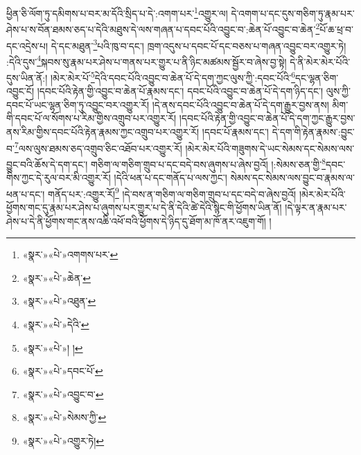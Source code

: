 ཕྱིན་ཅི་ལོག་ཏུ་དམིགས་པ་བར་མ་དོའི་སྲིད་པ་དེ་:འགག་པར་\footnote{«སྣར་»«པེ་»འགགས་པར་}འགྱུར་ལ། དེ་འགག་པ་དང་དུས་གཅིག་ཏུ་རྣམ་པར་ཤེས་པ་ས་བོན་ཐམས་ཅད་པ་དེའི་མཐུས་དེ་ལས་གཞན་པ་དབང་པོའི་འབྱུང་བ་:ཆེན་པོ་འབྱུང་བ་ཆེན་\footnote{«སྣར་»«པེ་»ཆེན་}པོ་ཆ་ཕྲ་བ་དང་འདྲེས་པ། དེ་དང་མཐུན་\footnote{«སྣར་»«པེ་»འཐུན་}པའི་ཁུ་བ་དང་། ཁྲག་འདུས་པ་དབང་པོ་དང་བཅས་པ་གཞན་འབྱུང་བར་འགྱུར་ཏེ། :དེའི་དུས་\footnote{«སྣར་»«པེ་»དེའི་}སྐབས་སུ་རྣམ་པར་ཤེས་པ་གནས་པར་གྱུར་པ་ནི་ཉིང་མཚམས་སྦྱོར་བ་ཞེས་བྱ་སྟེ། དེ་ནི་མེར་མེར་པོའི་དུས་ཡིན་ནོ:། །མེར་མེར་པོ་\footnote{«སྣར་»«པེ་»། །}དེའི་དབང་པོའི་འབྱུང་བ་ཆེན་པོ་དེ་དག་ཀྱང་ལུས་ཀྱི་:དབང་པོའི་\footnote{«སྣར་»«པེ་»དབང་པོ་}དང་ལྷན་ཅིག་འབྱུང་ངོ། །དབང་པོའི་རྟེན་གྱི་འབྱུང་བ་ཆེན་པོ་རྣམས་དང་། དབང་པོའི་འབྱུང་བ་ཆེན་པོ་དེ་དག་ཉིད་དང་། ལུས་ཀྱི་དབང་པོ་ཡང་ལྷན་ཅིག་ཏུ་འབྱུང་བར་འགྱུར་རོ། །དེ་ནས་དབང་པོའི་འབྱུང་བ་ཆེན་པོ་དེ་དག་རྒྱུར་བྱས་ནས། མིག་གི་དབང་པོ་ལ་སོགས་པ་རིམ་གྱིས་འགྲུབ་པར་འགྱུར་རོ། །དབང་པོའི་རྟེན་གྱི་འབྱུང་བ་ཆེན་པོ་དེ་དག་ཀྱང་རྒྱུར་བྱས་ནས་རིམ་གྱིས་དབང་པོའི་རྟེན་རྣམས་ཀྱང་འགྲུབ་པར་འགྱུར་རོ། །དབང་པོ་རྣམས་དང་། དེ་དག་གི་རྟེན་རྣམས་:བྱུང་བ་\footnote{«སྣར་»«པེ་»འབྱུང་བ་}ལས་ལུས་ཐམས་ཅད་འགྲུབ་ཅིང་འཐོབ་པར་འགྱུར་རོ། །མེར་མེར་པོའི་གཟུགས་དེ་ཡང་སེམས་དང་སེམས་ལས་བྱུང་བའི་ཆོས་དེ་དག་དང་། གཅིག་ལ་གཅིག་གྲུབ་པ་དང་བདེ་བས་ཞུགས་པ་ཞེས་བྱའོ། །:སེམས་ཅན་གྱི་\footnote{«སྣར་»«པེ་»སེམས་ཀྱི་}དབང་གིས་ཀྱང་དེ་རུལ་བར་མི་འགྱུར་རོ། །དེའི་ཕན་པ་དང་གནོད་པ་ལས་ཀྱང་། སེམས་དང་སེམས་ལས་བྱུང་བ་རྣམས་ལ་ཕན་པ་དང་། གནོད་པར་:འགྱུར་རོ།\footnote{«སྣར་»«པེ་»འགྱུར་ཏེ།} །དེ་བས་ན་གཅིག་ལ་གཅིག་གྲུབ་པ་དང་བདེ་བ་ཞེས་བྱའོ། །མེར་མེར་པོའི་ཕྱོགས་གང་དུ་རྣམ་པར་ཤེས་པ་ཞུགས་པར་གྱུར་པ་དེ་ནི་དེའི་ཚེ་དེའི་སྙིང་གི་ཕྱོགས་ཡིན་ནོ། །དེ་ལྟར་ན་རྣམ་པར་ཤེས་པ་དེ་ནི་ཕྱོགས་གང་ནས་འཆི་འཕོ་བའི་ཕྱོགས་དེ་ཉིད་དུ་ཐོག་མ་ཁོ་ནར་འཇུག་གོ། །
